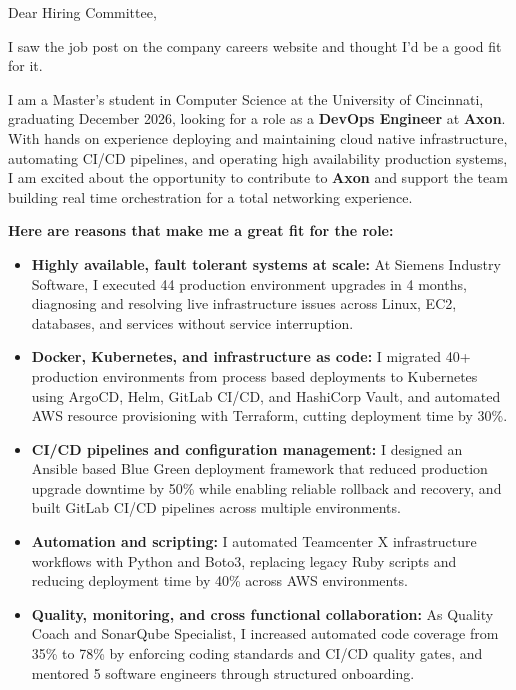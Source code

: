 \documentclass[11pt]{letter}
\date{}
\begin{document}
\begin{letter}{}

\opening{Dear Hiring Committee,}

I saw the job post on the company careers website and thought I'd be a good fit for it.

I am a Master's student in Computer Science at the University of Cincinnati, graduating December 2026, looking for a role as a \textbf{DevOps Engineer} at \textbf{Axon}. With hands on experience deploying and maintaining cloud native infrastructure, automating CI/CD pipelines, and operating high availability production systems, I am excited about the opportunity to contribute to \textbf{Axon} and support the team building real time orchestration for a total networking experience.

\textbf{Here are reasons that make me a great fit for the role:}

\begin{itemize}[leftmargin=*, itemsep=0.45em]
    \item \textbf{Highly available, fault tolerant systems at scale:} At Siemens Industry Software, I executed 44 production environment upgrades in 4 months, diagnosing and resolving live infrastructure issues across Linux, EC2, databases, and services without service interruption.

    \item \textbf{Docker, Kubernetes, and infrastructure as code:} I migrated 40+ production environments from process based deployments to Kubernetes using ArgoCD, Helm, GitLab CI/CD, and HashiCorp Vault, and automated AWS resource provisioning with Terraform, cutting deployment time by 30\%.

    \item \textbf{CI/CD pipelines and configuration management:} I designed an Ansible based Blue Green deployment framework that reduced production upgrade downtime by 50\% while enabling reliable rollback and recovery, and built GitLab CI/CD pipelines across multiple environments.

    \item \textbf{Automation and scripting:} I automated Teamcenter X infrastructure workflows with Python and Boto3, replacing legacy Ruby scripts and reducing deployment time by 40\% across AWS environments.

    \item \textbf{Quality, monitoring, and cross functional collaboration:} As Quality Coach and SonarQube Specialist, I increased automated code coverage from 35\% to 78\% by enforcing coding standards and CI/CD quality gates, and mentored 5 software engineers through structured onboarding.
\end{itemize}


\end{letter}
\end{document}
